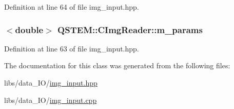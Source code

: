 Definition at line 64 of file img\-\_\-input.\-hpp.

\hypertarget{class_q_s_t_e_m_1_1_c_img_reader_ae4a0dfe8ad3a533128029463104a2355}{
\subsubsection[{m\-\_\-params}]{$<$double$>$ Q\-S\-T\-E\-M\-::\-C\-Img\-Reader\-::m\-\_\-params\hspace{0.3cm}{\ttfamily [protected]}}}\label{class_q_s_t_e_m_1_1_c_img_reader_ae4a0dfe8ad3a533128029463104a2355}


Definition at line 63 of file img\-\_\-input.\-hpp.



The documentation for this class was generated from the following files\-:\begin{DoxyCompactItemize}
\item 
libs/data\-\_\-\-I\-O/\hyperlink{img__input_8hpp}{img\-\_\-input.\-hpp}\item 
libs/data\-\_\-\-I\-O/\hyperlink{img__input_8cpp}{img\-\_\-input.\-cpp}\end{DoxyCompactItemize}

